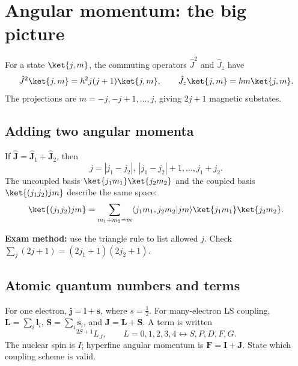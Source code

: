 
\section{Angular momentum: the big picture}
For a state \(\ket{j,m}\), the commuting operators \(\hat J^2\) and \(\hat J_z\) have
\[
\hat J^2\ket{j,m}=\hbar^2 j(j+1)\ket{j,m},\qquad
\hat J_z\ket{j,m}=\hbar m\ket{j,m}.
\]
The projections are \(m=-j,-j+1,\ldots,j\), giving \(2j+1\) magnetic substates.
\subsection{Adding two angular momenta}
If \(\hat{\mathbf J}=\hat{\mathbf J}_1+\hat{\mathbf J}_2\), then
\[
j=|j_1-j_2|,\ |j_1-j_2|+1,\ldots,j_1+j_2.
\]
The uncoupled basis \(\ket{j_1m_1}\ket{j_2m_2}\) and the coupled
basis \(\ket{(j_1j_2)jm}\) describe the same space:
\[
\ket{(j_1j_2)jm}
=\sum_{m_1+m_2=m}\langle j_1m_1,j_2m_2|jm\rangle
\ket{j_1m_1}\ket{j_2m_2}.
\]
\begin{methodbox}
\textbf{Exam method:} use the triangle rule to list allowed \(j\).
Check \(\sum_j(2j+1)=(2j_1+1)(2j_2+1)\).
\end{methodbox}
\subsection{Atomic quantum numbers and terms}
For one electron, \(\mathbf j=\mathbf l+\mathbf s\), where \(s=\tfrac12\).
For many-electron LS coupling,
\(\mathbf L=\sum_i\mathbf l_i\), \(\mathbf S=\sum_i\mathbf s_i\),
and \(\mathbf J=\mathbf L+\mathbf S\). A term is written
\[
{}^{2S+1}L_J,\qquad L=0,1,2,3,4\leftrightarrow S,P,D,F,G.
\]
The nuclear spin is \(I\); hyperfine angular momentum is
\(\mathbf F=\mathbf I+\mathbf J\). State which coupling scheme is valid.
